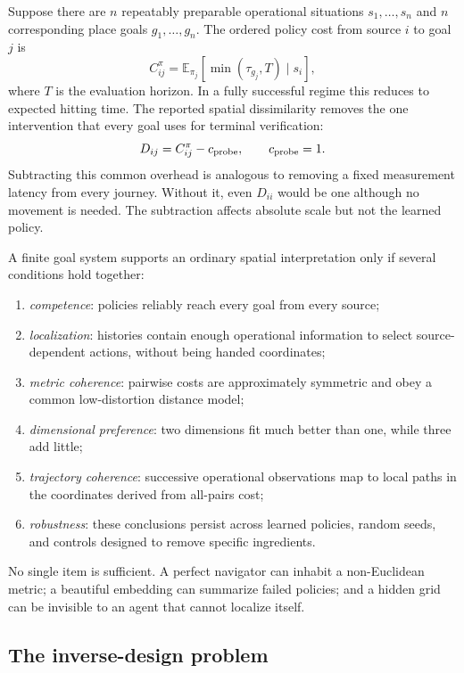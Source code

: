 \documentclass[11pt]{article}
\newcommand{\E}{\mathbb E}
\begin{document}
Suppose there are $n$ repeatably preparable operational situations
$s_1,\ldots,s_n$ and $n$ corresponding place goals $g_1,\ldots,g_n$. The
ordered policy cost from source $i$ to goal $j$ is
\begin{equation}
 C_{ij}^{\pi}=\E_{\pi_j}[\min(\tau_{g_j},T)\mid s_i],
 \label{eq:restricted-cost}
\end{equation}
where $T$ is the evaluation horizon. In a fully successful regime this reduces
to expected hitting time. The reported spatial dissimilarity removes the one
intervention that every goal uses for terminal verification:
\begin{equation}
 D_{ij}=C_{ij}^{\pi}-c_{\rm probe},\qquad c_{\rm probe}=1.
 \label{eq:spatial-cost}
\end{equation}
Subtracting this common overhead is analogous to removing a fixed measurement
latency from every journey. Without it, even $D_{ii}$ would be one although no
movement is needed. The subtraction affects absolute scale but not the learned
policy.

A finite goal system supports an ordinary spatial interpretation only if
several conditions hold together:
\begin{enumerate}
 \item \emph{competence}: policies reliably reach every goal from every source;
 \item \emph{localization}: histories contain enough operational information
 to select source-dependent actions, without being handed coordinates;
 \item \emph{metric coherence}: pairwise costs are approximately symmetric and
 obey a common low-distortion distance model;
 \item \emph{dimensional preference}: two dimensions fit much better than one,
 while three add little;
 \item \emph{trajectory coherence}: successive operational observations map to
 local paths in the coordinates derived from all-pairs cost;
 \item \emph{robustness}: these conclusions persist across learned policies,
 random seeds, and controls designed to remove specific ingredients.
\end{enumerate}
No single item is sufficient. A perfect navigator can inhabit a non-Euclidean
metric; a beautiful embedding can summarize failed policies; and a hidden grid
can be invisible to an agent that cannot localize itself.

\subsection{The inverse-design problem}
\end{document}
